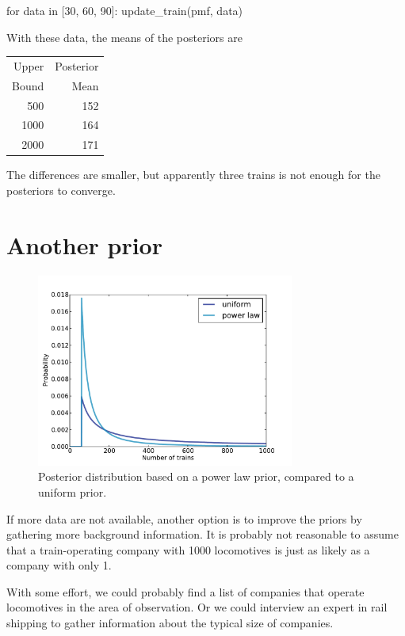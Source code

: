 \documentclass[12pt]{book}
\theoremstyle{exercise}
\begin{document}
\begin{code}
for data in [30, 60, 90]:
    update_train(pmf, data)
\end{code}

With these data, the means of the posteriors are

\begin{tabular}{r r}
\toprule
Upper & Posterior \\
Bound & Mean \\
\midrule
500 & 152 \\
1000 & 164\\
2000 & 171\\
\bottomrule
\end{tabular}

The differences are smaller, but apparently three trains is not enough for the posteriors to converge.


\section{Another prior}

\begin{figure}
\centerline{\includegraphics[height=2.5in]{figs/train4.pdf}}
\caption{Posterior distribution based on a power law prior,
compared to a uniform prior.}
\label{fig.train4}
\end{figure}

If more data are not available, another option is to improve the
priors by gathering more background information.  
It is probably not reasonable to assume that a train-operating company with 1000 locomotives is just as likely as a company with only 1.

With some effort, we could probably find a list of companies that
operate locomotives in the area of observation.
Or we could interview an expert in rail shipping to gather information about the typical size of companies.
\end{document}
